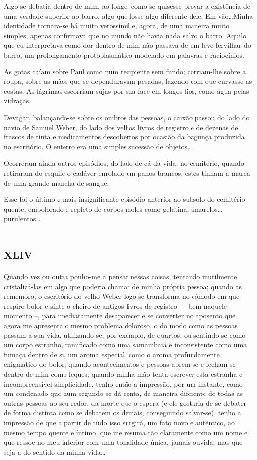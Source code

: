 Algo se debatia dentro de mim, ao longe, como se quisesse provar a existência de uma verdade superior ao barro, algo que fosse algo diferente dele. Em vão\dots Minha identidade tornara-se há muito verossímil e, agora, de uma maneira muito simples, apenas confirmava que no mundo não havia nada salvo o barro. Aquilo que eu interpretava como dor dentro de mim não passava de um leve fervilhar do barro, um prolongamento protoplasmático modelado em palavras e raciocínios.

As gotas caíam sobre Paul como num recipiente sem fundo; corriam-lhe sobre a roupa, sobre as mãos que se dependuravam pesadas, fazendo com que curvasse as costas. As lágrimas escorriam sujas por sua face em longos fios, como água pelas vidraças.

Devagar, balançando-se sobre os ombros das pessoas, o caixão passou do lado do navio de Samuel Weber, do lado dos velhos livros de registro e de dezenas de frascos de tinta e medicamentos descobertos por ocasião da bagunça produzida no escritório. O enterro era uma simples sucessão de objetos\dots

Ocorreram ainda outros episódios, do lado de cá da vida: no cemitério, quando retiraram do esquife o cadáver enrolado em panos brancos,  estes tinham a marca de uma grande mancha de sangue.

Esse foi o último e mais insignificante episódio anterior ao subsolo do cemitério quente, embolorado e repleto de corpos moles como gelatina, amarelos\dots purulentos\dots


\chapter*{\huge\centering\textsc{xliv}}

Quando vez ou outra ponho-me a pensar nessas coisas, tentando inutilmente cristalizá-las em algo que poderia chamar de minha própria pessoa; quando as rememoro, o escritório do velho Weber logo se transforma no cômodo em que respiro bolor e sinto o cheiro de antigos livros de registro --- bem naquele momento --, para imediatamente desaparecer e se converter no aposento que agora me apresenta o mesmo problema doloroso, o do modo como as pessoas passam a sua vida, utilizando-se, por exemplo, de quartos, ou sentindo-se como um corpo estranho, ramificado como uma samambaia e inconsistente como uma fumaça dentro de si, um aroma especial, como o aroma profundamente enigmático do bolor; quando acontecimentos e pessoas abrem-se e fecham-se dentro de mim como leques; quando minha mão tenta escrever esta estranha e incompreensível simplicidade, tenho então a impressão, por um instante, como um condenado que num segundo se dá conta, de maneira diferente de todas as outras pessoas ao seu redor, da morte que o espera (e ele gostaria de se debater de forma distinta como se debatem os demais, conseguindo salvar-se), tenho a impressão de que a partir de tudo isso surgirá, um fato novo e autêntico, ao mesmo tempo quente e íntimo, que me resuma tão claramente como um nome e que ressoe no meu interior com uma tonalidade única, jamais ouvida, mas que seja a do sentido da minha vida\dots

